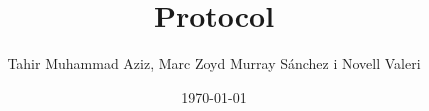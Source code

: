 \documentclass{article}
\title{ Protocol }
\author{ Tahir Muhammad Aziz, Marc Zoyd Murray Sánchez i Novell Valeri }
\date{\today}
\begin{document}
\maketitle	
\pagebreak

\tableofcontents
\end{document}
